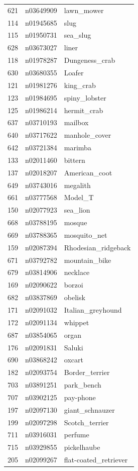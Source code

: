 \begin{table}
\begin{tabular}{cll}
621 & n03649909 & lawn_mower \\
114 & n01945685 & slug \\
115 & n01950731 & sea_slug \\
628 & n03673027 & liner \\
118 & n01978287 & Dungeness_crab \\
630 & n03680355 & Loafer \\
121 & n01981276 & king_crab \\
123 & n01984695 & spiny_lobster \\
125 & n01986214 & hermit_crab \\
637 & n03710193 & mailbox \\
640 & n03717622 & manhole_cover \\
642 & n03721384 & marimba \\
133 & n02011460 & bittern \\
137 & n02018207 & American_coot \\
649 & n03743016 & megalith \\
661 & n03777568 & Model_T \\
150 & n02077923 & sea_lion \\
668 & n03788195 & mosque \\
669 & n03788365 & mosquito_net \\
159 & n02087394 & Rhodesian_ridgeback \\
671 & n03792782 & mountain_bike \\
679 & n03814906 & necklace \\
169 & n02090622 & borzoi \\
682 & n03837869 & obelisk \\
171 & n02091032 & Italian_greyhound \\
172 & n02091134 & whippet \\
687 & n03854065 & organ \\
176 & n02091831 & Saluki \\
690 & n03868242 & oxcart \\
182 & n02093754 & Border_terrier \\
703 & n03891251 & park_bench \\
707 & n03902125 & pay-phone \\
197 & n02097130 & giant_schnauzer \\
199 & n02097298 & Scotch_terrier \\
711 & n03916031 & perfume \\
715 & n03929855 & pickelhaube \\
205 & n02099267 & flat-coated_retriever \\

\end{tabular}
\end{table}
